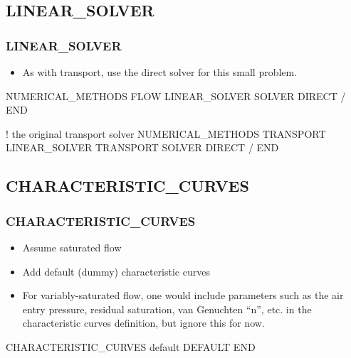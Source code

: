 \documentclass{beamer}
\newcommand\gehcomment[1]{{{\color{orange} #1}}}
\newcommand\bluecomment[1]{{{\color{blue} #1}}}
\newcommand\magentacomment[1]{{{\color{magenta} #1}}}
\begin{document}
\subsection{LINEAR\_SOLVER}

\begin{frame}[fragile]\frametitle{LINEAR\_SOLVER}

\begin{itemize}
\item As with transport, use the direct solver for this small problem.
\end{itemize}


\begin{semiverbatim}

\magentacomment{NUMERICAL_METHODS FLOW}
  \magentacomment{LINEAR_SOLVER}
    \magentacomment{SOLVER DIRECT}
  \magentacomment{/}
\magentacomment{END}

\bluecomment{! the original transport solver}
NUMERICAL_METHODS TRANSPORT
  LINEAR_SOLVER TRANSPORT 
    SOLVER DIRECT
  /
END
\end{semiverbatim}

\end{frame}

\subsection{CHARACTERISTIC\_CURVES}

\begin{frame}[fragile]\frametitle{CHARACTERISTIC\_CURVES}

\begin{itemize}
\item Assume saturated flow
\item Add default (dummy) characteristic curves
\item For variably-saturated flow, one would include parameters such as the air entry pressure, residual saturation, van Genuchten ``n'', etc. in the characteristic curves definition, \gehcomment{but ignore this for now}.
\end{itemize}

\begin{semiverbatim}

\magentacomment{CHARACTERISTIC_CURVES default
  DEFAULT
END}
\end{semiverbatim}

\end{frame}
\end{document}
